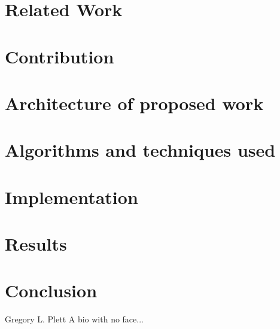 \documentclass[%
        draft,
        notitlepage,
        narroweqnarray,
        inline,
        twoside,
        ]{ieee}
\begin{document}
\section{Related Work}

\section{Contribution}

\section{Architecture of proposed work}

\section{Algorithms and techniques used}

\section{Implementation}

\section{Results}

\section{Conclusion}





\begin{biography}{Gregory L. Plett}
  A bio with no face...
\end{biography}

\end{document}
